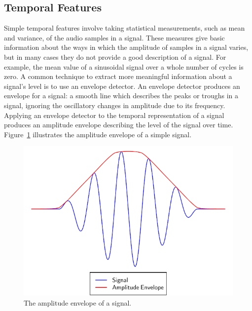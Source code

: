 	\subsection{Temporal Features}
	\label{sec:Timbre-LowLevelFeatures-Temporal}
		Simple temporal features involve taking statistical measurements, such as mean and variance, of the audio
		samples in a signal. These measures give basic information about the ways in which the amplitude of samples
		in a signal varies, but in many cases they do not provide a good description of a signal. For example, the
		mean value of a sinusoidal signal over a whole number of cycles is zero. A common technique to extract more
		meaningful information about a signal's level is to use an envelope detector. An envelope detector produces
		an envelope for a signal: a smooth line which describes the peaks or troughs in a signal, ignoring the
		oscillatory changes in amplitude due to its frequency. Applying an envelope detector to the temporal
		representation of a signal produces an amplitude envelope describing the level of the signal over time.
		Figure~\ref{fig:AmplitudeEnvelope} illustrates the amplitude envelope of a simple signal.

		\begin{figure}[h!]
			\centering
			\includegraphics{chapter2/Images/AmplitudeEnvelope.pdf}
			\caption{The amplitude envelope of a signal.}
			\label{fig:AmplitudeEnvelope}
		\end{figure}

